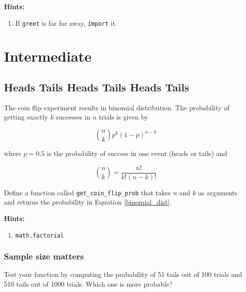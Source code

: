 \documentclass[a4paper]{article}
\begin{document}
\textbf{Hints:}
\begin{enumerate}
    \item If \texttt{greet} is far far away, \texttt{import} it.
\end{enumerate}

\newpage
\section{Intermediate}
\subsection{Heads Tails Heads Tails Heads Tails}

The coin flip experiment results in binomial distribution. The probability of getting exactly $k$ successes in $n$ trials is given by 

\begin{equation}
	{n\choose k}p^k(1 - p)^{n - k}
	\label{binomial_dist}
\end{equation}

where $p=0.5$ is the probability of success in one event (heads or tails) and

\begin{equation}
	{n\choose k} = \frac{n!}{k!(n - k)!}
	\label{n choose k}
\end{equation}

Define a function called \texttt{get\_coin\_flip\_prob} that takes $n$ and $k$ as arguments and returns the probability in Equation \ref{binomial_dist}.

\textbf{Hints:}
\begin{enumerate}
    \item \texttt{math.factorial}
\end{enumerate}

\subsubsection{Sample size matters}

Test your function by computing the probability of 51 tails out of 100 trials and 510 tails out of 1000 trials. Which one is more probable?

\newpage
\end{document}
